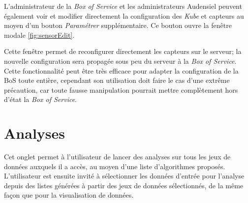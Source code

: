 \documentclass[a4paper]{report}
\begin{document}
L'administrateur de la \emph{Box of Service} et les administrateurs Audensiel peuvent également voir et modifier directement la configuration des \emph{Kube} et capteurs au moyen d'un bouton \emph{Paramétrer} supplémentaire. Ce bouton ouvre la fenêtre modale \ref{fig:sensorEdit}.

Cette fenêtre permet de reconfigurer directement les capteurs sur le serveur; la nouvelle configuration sera propagée sous peu du serveur à la \emph{Box of Service}. Cette fonctionnalité peut être très efficace pour adapter la configuration de la BoS toute entière, cependant son utilisation doit faire le cas d'une extrême précaution, car toute fausse manipulation pourrait mettre complètement hors d'état la \emph{Box of Service}.

\newpage
\section{Analyses}
\label{sec:analyses}


Cet onglet permet à l'utilisateur de lancer des analyses sur tous les jeux de données auxquels il a accès, au moyen d'une liste d'algorithmes proposés.\\ 
L'utilisateur est ensuite invité à sélectionner les données d'entrée pour l'analyse depuis des listes générées à partir des jeux de données sélectionnés, de la même façon que pour la visualisation de données.\\
\end{document}
